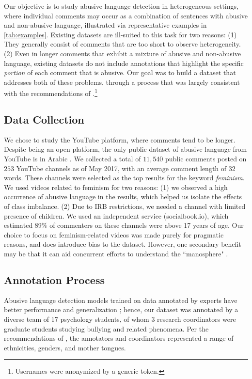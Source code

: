 \documentclass[letterpaper]{article} %
\begin{document}
Our objective is to study abusive language detection in heterogeneous settings, where  individual comments may occur as a combination of sentences with abusive and non-abusive language, illustrated via representative examples in \ref{tab:examples}.
Existing datasets are ill-suited to this task for two reasons: (1) They generally consist of comments that are too short to observe heterogeneity.
(2) Even in longer comments that exhibit a mixture of abusive and non-abusive language, existing datasets do not include annotations that highlight the specific \textit{portion} of each comment that is abusive.
Our goal was to build a dataset that addresses  both of these problems, through a process that was largely consistent with the recommendations of \cite{vidgen2019challenges}.\footnote{Usernames were anonymized by a generic token.}


\subsection{Data Collection}
We chose to study the YouTube platform, where comments tend to be longer.
Despite being an open platform, the  only public dataset of abusive language from YouTube is in Arabic \cite{alakrot2018dataset}.
We collected a total of $11,540$ public comments posted on $253$ YouTube channels as of May 2017,
with an average comment length of $32$ words.
These channels were selected as the top results for the keyword \textit{feminism}.
We used videos related to feminism  for two reasons:
(1) we observed a high occurrence of abusive language in the results, which helped us isolate the effects of class imbalance.
(2) Due to IRB restrictions, we needed a channel with limited presence of children. We used an independent service (socialbook.io), which estimated 89\% of commenters on these channels were above 17 years of age.
Our choice to focus on feminism-related videos was made purely for pragmatic reasons, and does introduce bias to the dataset.
However, one secondary benefit may be that it can aid concurrent efforts to understand the ``manosphere" \cite{ribeiroevolution}.


\subsection{Annotation Process}

Abusive language detection models trained on data annotated by experts have better performance and generalization \cite{waseem2016you};
hence, our dataset was annotated by a diverse team of  $17$ psychology students, of whom $3$ research coordinators were graduate students studying bullying and related phenomena.
Per the recommendations of \cite{vidgen2019challenges}, the annotators and coordinators represented a range of ethnicities, genders, and mother tongues.
\end{document}
